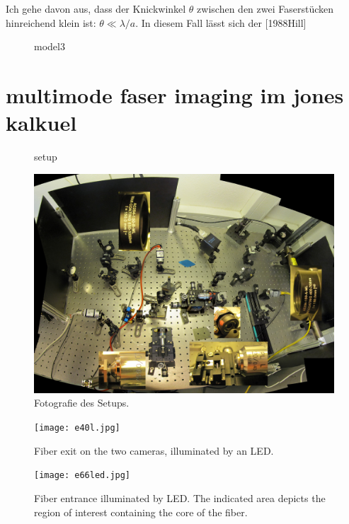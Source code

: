 \documentclass{article}
\begin{document}
Ich gehe davon aus, dass der Knickwinkel $\theta$ zwischen den zwei
Faserst\"ucken hinreichend klein ist: $\theta \ll \lambda/a$. In
diesem Fall l\"asst sich der
[1988Hill]

\begin{figure}[htbp]
  \centering
  
  \caption{model3}
  \label{fig:model3}
\end{figure}


\section{multimode faser imaging im jones kalkuel}

\begin{figure}[htbp]
  \centering
  
  \caption{setup}
  \label{fig:setup}
\end{figure}



\begin{figure}[htbp]
  \centering
  \includegraphics[width=12cm]{../multi-mode-imaging.jpg}
  \caption{Fotografie des Setups. }
  \label{fig:e40}
\end{figure}


\begin{figure}[htbp]
  \centering
  \texttt{[image: e40l.jpg]}
  \caption{Fiber exit on the two cameras, illuminated by an LED.}
  \label{fig:e40}
\end{figure}

\begin{figure}[htbp]
  \centering
  \texttt{[image: e66led.jpg]}
  \caption{Fiber entrance illuminated by LED. The indicated area
    depicts the region of interest containing the core of the fiber.}
  \label{fig:e66}
\end{figure}
\end{document}
